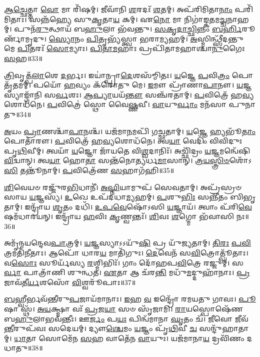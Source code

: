 \-\ul{𑌆}\-\-\ul{𑌚𑍍𑌛𑍇}\-𑌤𑍍𑌤𑌾 \ul{𑌵𑍋} 𑌮𑌾 𑌰𑌿᳴𑌷𑌮𑍍।
𑌜𑍀𑌵𑌾᳴𑌨𑌿 \ul{𑌶}\-𑌰𑌦𑌃᳴ \ul{𑌶}\-𑌤𑌮𑍍।
𑌅𑌪᳴𑌰𑌿𑌮𑌿𑌤𑌾\-\ul{𑌨𑌾𑌂} 𑌪𑌰𑌿᳴𑌮𑌿𑌤𑌾𑌃।
𑌸𑌨𑍍𑌨᳴𑌹𑍍𑌯𑍇 𑌸𑍁\-\ul{𑌕𑍃}\-𑌤𑌾\-\ul{𑌯} 𑌕𑌮𑍍।
𑌏\-\ul{𑌨𑍋} 𑌮𑌾 𑌨𑌿𑌗𑌾॑𑌙𑍍𑌕\-\ul{𑌤}\-𑌮\-\ul{𑌚𑍍𑌚}\-𑌨𑌾𑌹𑌮𑍍।
𑌪𑍁𑌨᳴\-\ul{𑌰𑍁}\-𑌤𑍍𑌥𑌾𑌯᳴ 𑌬\-\ul{𑌹𑍁}\-𑌲𑌾 𑌭᳴𑌵𑌨𑍍𑌤𑍁।
\-\ul{𑌸}\-\-\ul{𑌕𑍃}\-\-\ul{𑌦𑌾}\-\-\ul{𑌚𑍍𑌛𑌿}\-𑌨𑍍𑌨𑌂 \ul{𑌬}\-\-\ul{𑌰𑍍}\-𑌹𑌿𑌰𑍂𑌰𑍍𑌣𑌾᳴𑌮𑍃𑌦𑍁।
\-\ul{𑌸𑍍𑌯𑍋}\-𑌨𑌂 \ul{𑌪𑌿}\-𑌤𑍃𑌭𑍍𑌯᳴𑌸𑍍𑌤𑍍𑌵𑌾 𑌭𑌰𑌾\-\ul{𑌮𑍍𑌯}\-𑌹𑌮𑍍।
\-\ul{𑌅}\-𑌸𑍍𑌮𑌿𑌨𑍍𑌥𑍍𑌸𑍀᳴𑌦𑌨𑍍𑌤𑍁 𑌮𑍇 \ul{𑌪𑌿}\-𑌤𑌰𑌃᳴ \ul{𑌸𑍋}\-𑌮𑍍𑌯𑌾𑌃।
\-\ul{𑌪𑌿}\-\-\ul{𑌤𑌾}\-\-\ul{𑌮}\-𑌹𑌾𑌃 𑌪𑍍𑌰𑌪𑌿᳴𑌤𑌾𑌮𑌹𑌾𑌶𑍍𑌚𑌾\-\ul{𑌨𑍁}\-𑌗𑍈𑌃 \ul{𑌸}\-𑌹॥33॥

\-\ul{𑌤𑍍𑌰𑌿}\-𑌵𑍃𑌤𑍍𑌪᳴\-\ul{𑌲𑌾}\-𑌶𑍇 \ul{𑌦}\-𑌰𑍍𑌭𑌃।
𑌇𑌯𑌾॑𑌨𑍍𑌪𑍍𑌰𑌾\-\ul{𑌦𑍇}\-𑌶𑌸᳴𑌮𑍍𑌮𑌿𑌤𑌃।
\-\ul{𑌯}\-𑌜𑍍𑌞𑍇 \ul{𑌪}\-𑌵𑌿\-\ul{𑌤𑍍𑌰𑌂} 𑌪𑍋𑌤𑍃᳴𑌤𑌮𑌮𑍍।
𑌪𑌯𑍋᳴ \ul{𑌹}\-𑌵𑍍𑌯𑌂 𑌕᳴𑌰𑍋𑌤𑍁 𑌮𑍇।
\-\ul{𑌇}\-𑌮𑍗 𑌪𑍍𑌰𑌾᳴𑌣𑌾\-\ul{𑌪𑌾}\-𑌨𑍗।
\-\ul{𑌯}\-𑌜𑍍𑌞𑌸𑍍𑌯𑌾𑌙𑍍𑌗𑌾᳴𑌨𑌿 𑌸\-\ul{𑌰𑍍𑌵}\-𑌶𑌃।
\-\ul{𑌆}\-\-\ul{𑌪𑍍𑌯𑌾}\-𑌯𑌯᳴\-\ul{𑌨𑍍𑌤𑍗} 𑌸𑌞𑍍𑌚᳴𑌰𑌤𑌾𑌮𑍍।
\-\ul{𑌪}\-𑌵𑌿𑌤𑍍𑌰𑍇᳴ 𑌹\-\ul{𑌵𑍍𑌯}\-𑌶𑍋𑌧᳴𑌨𑍇।
\-\ul{𑌪}\-𑌵𑌿𑌤𑍍𑌰𑍇॑ 𑌸𑍍𑌥𑍋 𑌵𑍈\-\ul{𑌷𑍍𑌣}\-𑌵𑍀।
\-\ul{𑌵𑌾}\-𑌯𑍁\-\ul{𑌰𑍍𑌵𑌾𑌂} 𑌮𑌨᳴𑌸𑌾 𑌪𑍁𑌨𑌾𑌤𑍁॥34॥

\-\ul{𑌅}\-𑌯𑌂 \ul{𑌪𑍍𑌰𑌾}\-𑌣𑌶𑍍𑌚𑌾᳴\-\ul{𑌪𑌾}\-𑌨𑌶𑍍𑌚᳴।
𑌯𑌜᳴𑌮𑌾\-\ul{𑌨}\-𑌮𑌪𑌿᳴ 𑌗𑌚𑍍𑌛𑌤𑌾𑌮𑍍।
\-\ul{𑌯}\-𑌜𑍍𑌞𑍇 𑌹𑍍𑌯𑌭𑍂᳴\-\ul{𑌤𑌾𑌂} 𑌪𑍋𑌤𑌾᳴𑌰𑍗।
\-\ul{𑌪}\-𑌵𑌿𑌤𑍍𑌰𑍇᳴ 𑌹\-\ul{𑌵𑍍𑌯}\-𑌶𑍋𑌧᳴𑌨𑍇।
𑌤𑍍𑌵\-\ul{𑌯𑌾} 𑌵𑍇𑌦𑌿𑌂᳴ 𑌵𑌿𑌵𑌿𑌦𑍁𑌃 𑌪𑍃\-\ul{𑌥𑌿}\-𑌵𑍀𑌮𑍍।
𑌤𑍍𑌵𑌯𑌾᳴ \ul{𑌯}\-𑌜𑍍𑌞𑍋 𑌜𑌾᳴𑌯𑌤𑍇 𑌵𑌿\-\ul{𑌶𑍍𑌵}\-𑌦𑌾𑌨𑌿𑌃᳴।
𑌅𑌚𑍍𑌛𑌿᳴𑌦𑍍𑌰𑌂 \ul{𑌯}\-𑌜𑍍𑌞𑌮𑌨𑍍𑌵𑍇᳴𑌷𑌿 \ul{𑌵𑌿}\-𑌦𑍍𑌵𑌾𑌨𑍍।
𑌤𑍍𑌵\-\ul{𑌯𑌾} 𑌹𑍋\-\ul{𑌤𑌾} 𑌸𑌨𑍍𑌤᳴𑌨𑍋𑌤𑍍𑌯𑌰𑍍𑌧\-\ul{𑌮𑌾}\-𑌸𑌾𑌨𑍍।
\-\ul{𑌤𑍍𑌰}\-\-\ul{𑌯}\-\-\ul{𑌸𑍍𑌤𑍍𑌰𑌿}\-\-\ul{𑍞}\-𑌶𑍋᳴𑌽\-\ul{𑌸𑌿} 𑌤𑌨𑍍𑌤𑍂᳴𑌨𑌾𑌮𑍍।
\-\ul{𑌪}\-𑌵𑌿𑌤𑍍𑌰𑍇᳴𑌣 \ul{𑌸}\-𑌹𑌾𑌗᳴𑌹𑌿॥35॥

\-\ul{𑌶𑌿}\-𑌵𑍇𑌯𑍞 𑌰𑌜𑍍𑌜𑍁᳴𑌰\-\ul{𑌭𑌿}\-𑌧𑌾𑌨𑍀॑।
\-\ul{𑌅}\-\-\ul{𑌘𑍍𑌨𑌿}\-𑌯𑌾𑌮𑍁𑌪᳴ 𑌸𑍇𑌵𑌤𑌾𑌮𑍍।
𑌅𑌪𑍍𑌰᳴𑌸𑍍𑌰𑍞𑌸𑌾𑌯 \ul{𑌯}\-𑌜𑍍𑌞𑌸𑍍𑌯᳴।
\-\ul{𑌉}\-𑌖𑍇 𑌉𑌪᳴𑌦𑌧𑌾\-\ul{𑌮𑍍𑌯}\-𑌹𑌮𑍍।
\-\ul{𑌪}\-𑌶𑍁\-\ul{𑌭𑌿𑌃} 𑌸𑌨𑍍𑌨𑍀᳴𑌤𑌂 𑌬𑌿𑌭𑍃𑌤𑌾𑌮𑍍।
𑌇𑌨𑍍𑌦𑍍𑌰𑌾᳴𑌯 \ul{𑌶𑍃}\-𑌤𑌂 𑌦𑌧𑌿᳴।
\-\ul{𑌉}\-\-\ul{𑌪}\-\-\ul{𑌵𑍇}\-𑌷𑍋᳴𑌽𑌸𑌿 \ul{𑌯}\-𑌜𑍍𑌞𑌾𑌯᳴।
𑌤𑍍𑌵𑌾𑌂 𑌪᳴𑌰𑌿\-\ul{𑌵𑍇}\-𑌷𑌮᳴𑌧𑌾𑌰𑌯𑌨𑍍।
𑌇𑌨𑍍𑌦𑍍𑌰𑌾᳴𑌯 \ul{𑌹}\-𑌵𑌿𑌃 \ul{𑌕𑍃}\-𑌣𑍍𑌵𑌨𑍍𑌤𑌃᳴।
\-\ul{𑌶𑌿}\-𑌵𑌃 \ul{𑌶}\-𑌗𑍍𑌮𑍋 𑌭᳴𑌵𑌾𑌸𑌿 𑌨𑌃॥36॥

𑌅𑌮𑍃᳴𑌨𑍍𑌮𑌯𑌨𑍍𑌦𑍇𑌵\-\ul{𑌪𑌾}\-𑌤𑍍𑌰𑌮𑍍।
\-\ul{𑌯}\-𑌜𑍍𑌞𑌸𑍍𑌯𑌾𑌽𑌽𑌯𑍁᳴\-\ul{𑌷𑌿} 𑌪𑍍𑌰 𑌯𑍁᳴𑌜𑍍𑌯𑌤𑌾𑌮𑍍।
\-\ul{𑌤𑌿}\-\-\ul{𑌰𑌃} \ul{𑌪}\-\-\ul{𑌵𑌿}\-𑌤𑍍𑌰𑌮𑌤𑌿᳴𑌨𑍀𑌤𑌾𑌃।
𑌆𑌪𑍋᳴ 𑌧𑌾𑌰\-\ul{𑌯} 𑌮𑌾𑌤𑌿᳴𑌗𑍁𑌃।
\-\ul{𑌦𑍇}\-𑌵𑍇𑌨᳴ 𑌸\-\ul{𑌵𑌿}\-𑌤𑍍𑌰𑍋𑌤𑍍𑌪𑍂᳴𑌤𑌾𑌃।
𑌵\-\ul{𑌸𑍋𑌃} 𑌸𑍂𑌰𑍍𑌯᳴𑌸𑍍𑌯 \ul{𑌰}\-𑌶𑍍𑌮𑌿𑌭𑌿𑌃᳴।
𑌗𑌾𑌂 𑌦𑍋᳴𑌹𑌪\-\ul{𑌵𑌿}\-𑌤𑍍𑌰𑍇 𑌰𑌜𑍍𑌜𑍁𑌮𑍍॑।
𑌸\-\ul{𑌰𑍍𑌵𑌾} 𑌪𑌾𑌤𑍍𑌰𑌾᳴𑌣𑌿 𑌶𑍁𑌨𑍍𑌧𑌤।
\-\ul{𑌏}\-𑌤𑌾 𑌆 𑌚᳴𑌰\-\ul{𑌨𑍍𑌤𑌿} 𑌮𑌧𑍁᳴\-\ul{𑌮}\-𑌦𑍍𑌦𑍁𑌹𑌾᳴𑌨𑌾𑌃।
\-\ul{𑌪𑍍𑌰}\-𑌜𑌾𑌵᳴𑌤𑍀\-\ul{𑌰𑍍𑌯}\-𑌶𑌸𑍋᳴ \ul{𑌵𑌿}\-𑌶𑍍𑌵𑌰𑍂᳴𑌪𑌾𑌃॥37॥

\-\ul{𑌬}\-𑌹𑍍𑌵𑍀𑌰𑍍𑌭𑌵᳴\-\ul{𑌨𑍍𑌤𑍀}\-𑌰𑍁\-\ul{𑌪}\-𑌜𑌾𑌯᳴𑌮𑌾𑌨𑌾𑌃।
\-\ul{𑌇}\-𑌹 \ul{𑌵} 𑌇𑌨𑍍𑌦𑍍𑌰𑍋᳴ 𑌰𑌮𑌯𑌤𑍁 𑌗𑌾𑌵𑌃।
\-\ul{𑌪𑍂}\-𑌷𑌾 𑌸𑍍𑌥᳴।
\-\ul{𑌅}\-\-\ul{𑌯}\-𑌕𑍍𑌷𑍍𑌮𑌾 𑌵𑌃᳴ \ul{𑌪𑍍𑌰}\-𑌜\-\ul{𑌯𑌾} 𑌸𑍞 𑌸𑍃᳴𑌜𑌾𑌮𑌿।
\-\ul{𑌰𑌾}\-𑌯𑌸𑍍𑌪𑍋𑌷𑍇᳴𑌣 𑌬\-\ul{𑌹𑍁}\-𑌲𑌾𑌭𑌵᳴𑌨𑍍𑌤𑍀𑌃।
𑌊\-\ul{𑌰𑍍𑌜𑌂} 𑌪\-\ul{𑌯𑌃} 𑌪𑌿𑌨𑍍𑌵᳴𑌮𑌾𑌨𑌾 \ul{𑌘𑍃}\-𑌤𑌂 𑌚᳴।
\-\ul{𑌜𑍀}\-𑌵𑍋 𑌜𑍀𑌵᳴\-\ul{𑌨𑍍𑌤𑍀}\-𑌰𑍁𑌪᳴𑌵𑌃 𑌸𑌦𑍇𑌯𑌮𑍍।
𑌦𑍍𑌯𑍗\-\ul{𑌶𑍍𑌚𑍇}\-𑌮𑌂 \ul{𑌯}\-𑌜𑍍𑌞𑌂 𑌪𑍃᳴\-\ul{𑌥𑌿}\-𑌵𑍀 \ul{𑌚} 𑌸𑌨𑍍𑌦𑍁᳴𑌹𑌾𑌤𑌾𑌮𑍍।
\-\ul{𑌧𑌾}\-𑌤𑌾 𑌸𑍋𑌮𑍇᳴𑌨 \ul{𑌸}\-𑌹 𑌵𑌾𑌤𑍇᳴𑌨 \ul{𑌵𑌾}\-𑌯𑍁𑌃।
𑌯𑌜᳴𑌮𑌾𑌨𑌾\-\ul{𑌯} 𑌦𑍍𑌰𑌵𑌿᳴𑌣𑌂 𑌦𑌧𑌾𑌤𑍁॥38॥


